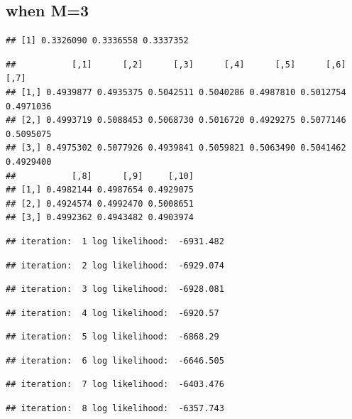 \documentclass[
]{article}
\begin{document}
\hypertarget{when-m3}{%
\subsection{when M=3}\label{when-m3}}

\begin{verbatim}
## [1] 0.3326090 0.3336558 0.3337352
\end{verbatim}

\begin{verbatim}
##           [,1]      [,2]      [,3]      [,4]      [,5]      [,6]      [,7]
## [1,] 0.4939877 0.4935375 0.5042511 0.5040286 0.4987810 0.5012754 0.4971036
## [2,] 0.4993719 0.5088453 0.5068730 0.5016720 0.4929275 0.5077146 0.5095075
## [3,] 0.4975302 0.5077926 0.4939841 0.5059821 0.5063490 0.5041462 0.4929400
##           [,8]      [,9]     [,10]
## [1,] 0.4982144 0.4987654 0.4929075
## [2,] 0.4924574 0.4992470 0.5008651
## [3,] 0.4992362 0.4943482 0.4903974
\end{verbatim}

\begin{verbatim}
## iteration:  1 log likelihood:  -6931.482
\end{verbatim}

\begin{verbatim}
## iteration:  2 log likelihood:  -6929.074
\end{verbatim}

\begin{verbatim}
## iteration:  3 log likelihood:  -6928.081
\end{verbatim}

\begin{verbatim}
## iteration:  4 log likelihood:  -6920.57
\end{verbatim}

\begin{verbatim}
## iteration:  5 log likelihood:  -6868.29
\end{verbatim}

\begin{verbatim}
## iteration:  6 log likelihood:  -6646.505
\end{verbatim}

\begin{verbatim}
## iteration:  7 log likelihood:  -6403.476
\end{verbatim}

\begin{verbatim}
## iteration:  8 log likelihood:  -6357.743
\end{verbatim}
\end{document}
